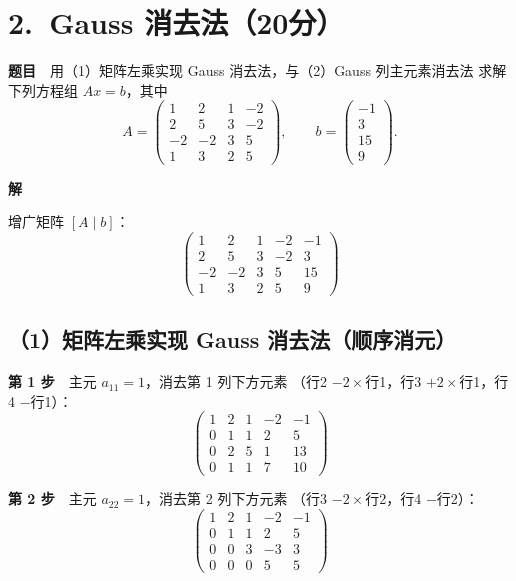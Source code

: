 \documentclass[a4paper,11pt]{ctexart}
\begin{document}
\section*{2.\ Gauss 消去法（20分）}

\textbf{题目}　用（1）矩阵左乘实现 Gauss 消去法，与（2）Gauss 列主元素消去法
求解下列方程组 $Ax=b$，其中
\[
  A=\begin{pmatrix}
    1 & 2 & 1 & -2\\
    2 & 5 & 3 & -2\\
    -2 & -2 & 3 & 5\\
    1 & 3 & 2 & 5
  \end{pmatrix},\qquad
  b=\begin{pmatrix}-1\\3\\15\\9\end{pmatrix}.
\]

\textbf{解}

增广矩阵 $[A\mid b]$：
\[
  \left(\begin{array}{rrrr|r}
    1 & 2 & 1 & -2 & -1\\
    2 & 5 & 3 & -2 & 3\\
    -2 & -2 & 3 & 5 & 15\\
    1 & 3 & 2 & 5 & 9
  \end{array}\right)
\]

\subsection*{（1）矩阵左乘实现 Gauss 消去法（顺序消元）}

\textbf{第 1 步}　主元 $a_{11}=1$，消去第 1 列下方元素
（行2 $-2\times$行1，行3 $+2\times$行1，行4 $-$行1）：
\[
  \left(\begin{array}{rrrr|r}
    1 & 2 & 1 & -2 & -1\\
    0 & 1 & 1 & 2 & 5\\
    0 & 2 & 5 & 1 & 13\\
    0 & 1 & 1 & 7 & 10
  \end{array}\right)
\]

\textbf{第 2 步}　主元 $a_{22}=1$，消去第 2 列下方元素
（行3 $-2\times$行2，行4 $-$行2）：
\[
  \left(\begin{array}{rrrr|r}
    1 & 2 & 1 & -2 & -1\\
    0 & 1 & 1 & 2 & 5\\
    0 & 0 & 3 & -3 & 3\\
    0 & 0 & 0 & 5 & 5
  \end{array}\right)
\]
\end{document}
